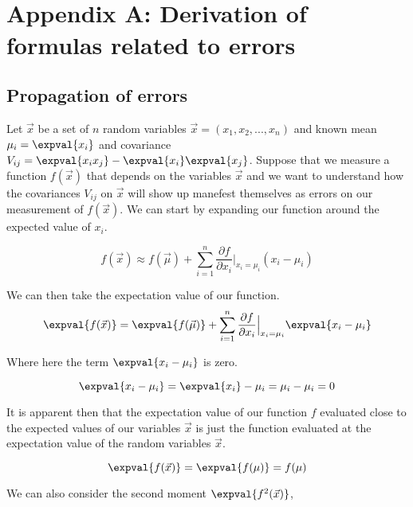 \appendix 

\section*{\\Appendix A: Derivation of formulas related to errors}

\subsection*{Propagation of errors}

Let $\vec{x}$ be a set of $n$ random variables $\vec{x} = (x_1, x_2, ..., x_n)$ and known mean $\mu_i = \expval{x_i}$ and covariance $V_{ij} = \expval{x_i x_j}-\expval{x_i}\expval{x_j}$.  Suppose that we measure a function $f(\vec{x})$ that depends on the variables $\vec{x}$ and we want to understand how the covariances $V_{ij}$ on $\vec{x}$ will show up manefest themselves as errors on our measurement of $f(\vec{x})$.  We can start by expanding our function around the expected value of $x_i$.

\begin{equation}
        f(\vec{x}) \approx f(\vec{\mu}) + \sum_{i=1}^{n} \frac{\partial f}{\partial x_i} \Bigr|_{x_i = \mu_i} (x_i - \mu_i)
\end{equation}

We can then take the expectation value of our function.
\begin{equation}
        \expval{f(\vec{x})} = \expval{f(\vec{\mu})} + \sum_{i=1}^{n} \frac{\partial f}{\partial x_i} \Bigr|_{x_i = \mu_i} \expval{x_i - \mu_i}
\end{equation}

Where here the term $ \expval{x_i - \mu_i}$ is zero.

\begin{equation}
        \expval{x_i - \mu_i} = \expval{x_i} - \mu_i = \mu_i - \mu_i = 0
\end{equation}

It is apparent then that the expectation value of our function $f$ evaluated close to the expected values of our variables $\vec{x}$ is just the function evaluated at the expectation value of the random variables $\vec{x}$.

\begin{equation}
        \expval{f(\vec{x})} = \expval{f(\mu)} = f(\mu)
\end{equation}

We can also consider the second moment $\expval{f^2(\vec{x})}$,  

